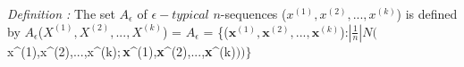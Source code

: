 \documentclass[preview]{standalone}
\begin{document}
\begin{center}
\textit{Definition :} The set $A_{\epsilon}$ of $\epsilon -typical$ $n$-sequences ($x^{(1)},x^{(2)},...,x^{(k)}$) is defined by $A_{\epsilon}$($X^{(1)},X^{(2)},...,X^{(k)}$) = $A_{\epsilon}$ = \{($\textbf{x}^{(1)},\textbf{x}^{(2)},...,\textbf{x}^{(k)}$):$|\frac{1}{n}| N($x^{(1)},x^{(2)},...,x^{(k)}$;$\textbf{x}^{(1)},\textbf{x}^{(2)},...,\textbf{x}^{(k)}$))\}$
\end{center}
\end{document}
